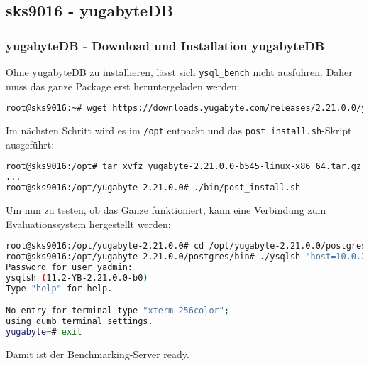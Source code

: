 
\begin{flushleft}
    \subsection{sks9016 - yugabyteDB}
    \subsubsection{yugabyteDB - Download und Installation yugabyteDB}
    Ohne yugabyteDB zu installieren, lässt sich \texttt{ysql\_bench} nicht ausführen.
    Daher muss das ganze Package erst heruntergeladen werden:
    \lstset{style=gra_codestyle}
    \begin{lstlisting}[language=bash, caption=sks9016 - Download yugabyteDB On-Premise,captionpos=b,label={lst:sks9016-yugabytedb-download-on-premise},breaklines=true]
root@sks9016:~# wget https://downloads.yugabyte.com/releases/2.21.0.0/yugabyte-2.21.0.0-b545-linux-x86_64.tar.gz
    \end{lstlisting}
\end{flushleft}
\begin{flushleft}
    Im nächsten Schritt wird es im \texttt{/opt} entpackt und das \texttt{post\_install.sh}-Skript ausgeführt:
    \lstset{style=gra_codestyle}
    \begin{lstlisting}[language=bash, caption=sks9016 - Installation yugabyteDB On-Premise,captionpos=b,label={lst:sks9016-yugabytedb-install-on-premise},breaklines=true]
root@sks9016:/opt# tar xvfz yugabyte-2.21.0.0-b545-linux-x86_64.tar.gz && cd yugabyte-2.21.0.0/
...
root@sks9016:/opt/yugabyte-2.21.0.0# ./bin/post_install.sh
    \end{lstlisting}
\end{flushleft}
\begin{flushleft}
    Um nun zu testen, ob das Ganze funktioniert, kann eine Verbindung zum Evaluationssystem hergestellt werden:
    \lstset{style=gra_codestyle}
    \begin{lstlisting}[language=bash, caption=sks9016 - Check yugabyteDB On-Premise,captionpos=b,label={lst:sks9016-yugabytedb-check-on-premise},breaklines=true]
root@sks9016:/opt/yugabyte-2.21.0.0# cd /opt/yugabyte-2.21.0.0/postgres/bin/
root@sks9016:/opt/yugabyte-2.21.0.0/postgres/bin# ./ysqlsh "host=10.0.20.106 user=yadmin"
Password for user yadmin:
ysqlsh (11.2-YB-2.21.0.0-b0)
Type "help" for help.

No entry for terminal type "xterm-256color";
using dumb terminal settings.
yugabyte=# exit
    \end{lstlisting}
    Damit ist der Benchmarking-Server ready.
\end{flushleft}